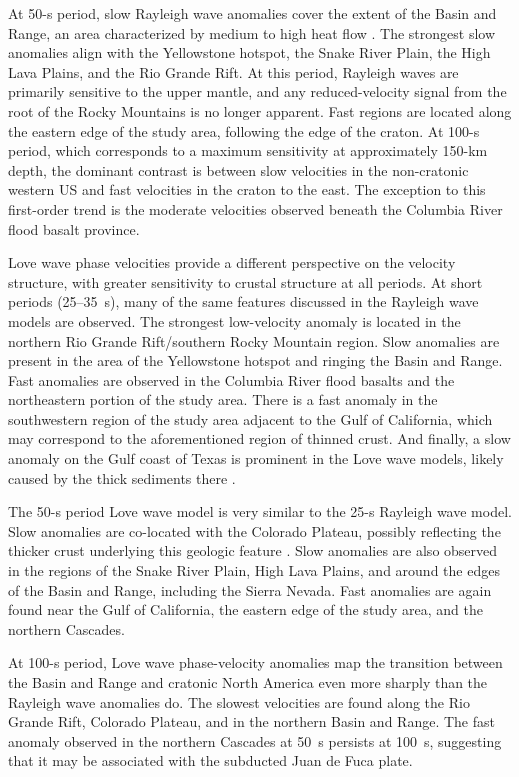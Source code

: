 \documentclass[12pt,oneside]{book}
\begin{document}
At 50\nobreakdash-s period, slow Rayleigh wave anomalies cover the extent of the Basin and Range, an area characterized by medium to high heat flow \citep{Lysak1992}. The strongest slow anomalies align with the Yellowstone hotspot, the Snake River Plain, the High Lava Plains, and the Rio Grande Rift. At this period, Rayleigh waves are primarily sensitive to the upper mantle, and any reduced-velocity signal from the root of the Rocky Mountains is no longer apparent. Fast regions are located along the eastern edge of the study area, following the edge of the craton. At 100\nobreakdash-s period, which corresponds to a maximum sensitivity at approximately 150\nobreakdash-km depth, the dominant contrast is between slow velocities in the non-cratonic western US and fast velocities in the craton to the east. The exception to this first-order trend is the moderate velocities observed beneath the Columbia River flood basalt province. 

Love wave phase velocities provide a different perspective on the velocity structure, with greater sensitivity to crustal structure at all periods. At short periods (25\nobreakdash--35~s), many of the same features discussed in the Rayleigh wave models are observed. The strongest low-velocity anomaly is located in the northern Rio Grande Rift/southern Rocky Mountain region. Slow anomalies are present in the area of the Yellowstone hotspot and ringing the Basin and Range. Fast anomalies are observed in the Columbia River flood basalts and the northeastern portion of the study area. There is a fast anomaly in the southwestern region of the study area adjacent to the Gulf of California, which may correspond to the aforementioned region of thinned crust. And finally, a slow anomaly on the Gulf coast of Texas is prominent in the Love wave models, likely caused by the thick sediments there \citep{McGookey1975}. 

The 50\nobreakdash-s period Love wave model is very similar to the 25\nobreakdash-s Rayleigh wave model. Slow anomalies are co-located with the Colorado Plateau, possibly reflecting the thicker crust underlying this geologic feature \citep{Zandtetal1995}. Slow anomalies are also observed in the regions of the Snake River Plain, High Lava Plains, and around the edges of the Basin and Range, including the Sierra Nevada. Fast anomalies are again found near the Gulf of California, the eastern edge of the study area, and the northern Cascades. 

At 100\nobreakdash-s period, Love wave phase-velocity anomalies map the transition between the Basin and Range and cratonic North America even more sharply than the Rayleigh wave anomalies do. The slowest velocities are found along the Rio Grande Rift, Colorado Plateau, and in the northern Basin and Range. The fast anomaly observed in the northern Cascades at 50~s persists at 100~s, suggesting that it may be associated with the subducted Juan de Fuca plate.
\end{document}
